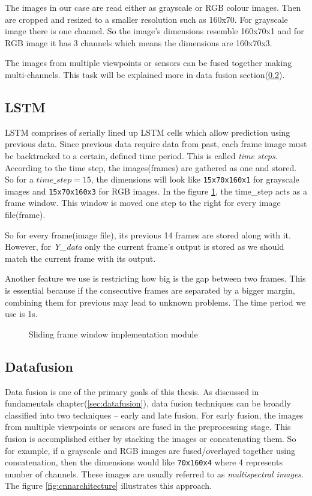 The images in our case are read either as grayscale or RGB colour images. Then are cropped
and resized to a smaller resolution such as 160x70. For grayscale image there is one
channel. So the image's dimensions resemble 160x70x1 and for RGB image it has 3 channels
which means the dimensions are 160x70x3.

The images from multiple viewpoints or sensors can be fused together making
multi-channels. This task will be explained more in data fusion
section(\ref{chap05Implsubsec:datafusion1}).

\subsection{LSTM}

LSTM comprises of serially lined up LSTM cells which allow prediction using previous
data. Since previous data require data from past, each frame image must be backtracked to
a certain, defined time period. This is called \textit{time steps}. According to the time
step, the images(frames) are gathered as one and stored. So for a $time\_step = 15$, the
dimensions will look like \texttt{15x70x160x1} for grayscale images and \texttt{15x70x160x3} for RGB
images. In the figure \ref{fig:slidingwindow}, the time\_step acts as a frame window. This
window is moved one step to the right for every image file(frame).

So for every frame(image file), its previous 14 frames are stored along with it. However,
for \textit{Y\_{data}} only the current frame's output is stored as we should match the
current frame with its output.

Another feature we use is restricting how big is the gap between two frames. This is
essential because if the consecutive frames are separated by a bigger margin, combining
them for previous may lead to unknown problems. The time period we use is 1s.
\begin{figure}[!ht]
	\centering
    \def\svgwidth{0.8\textwidth}
    \caption{Sliding frame window implementation module}
    \label{fig:slidingwindow}
\end{figure}

\subsection{Datafusion}
\label{chap05Implsubsec:datafusion1}
Data fusion is one of the primary goals of this thesis. As discussed in fundamentals
chapter(\ref{sec:datafusion}), data fusion techniques can be broadly classified  into two techniques -- early and late
fusion. For early fusion, the images from multiple viewpoints or sensors are fused in the
preprocessing stage. This fusion is accomplished either by stacking the images or
concatenating them. So for example, if a grayscale and RGB images are fused/overlayed together using
concatenation, then the dimensions would like \texttt{70x160x4} where 4 represents number
of channels. These images are usually referred to as \textit{multispectral images}. The figure \ref{fig:cnnarchitecture} illustrates this approach.

